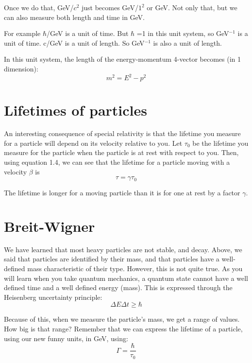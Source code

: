 Once we do that, GeV/$c^2$ just becomes GeV/$1^2$ or GeV. Not only that, but we can also measure both length and time in GeV.

\noindent For example  $\hbar$/GeV is a unit of time.  But $\hbar$ =1 in this unit system, so GeV$^{-1}$ is a unit of time.  c/GeV is a unit of length.  So GeV$^{-1}$ is also a unit of length.


In this unit system, the length of the energy-momentum 4-vector becomes (in 1 dimension):
\begin{equation}
	  m^2 = E^2 - p^2
\end{equation}  	 


\section{Lifetimes of particles}

An interesting consequence of special relativity is that the lifetime you measure for a particle will depend on its velocity relative to you.  Let $\tau _0$  be the lifetime you measure for the particle when the particle is at rest with respect to you.  Then, using equation 1.4, we can see that the lifetime for a particle moving with a velocity $\beta$  is
\begin{equation}
	 \tau  = \gamma \tau _0
\end{equation}  	 

\noindent The lifetime is longer for a moving particle than it is for one at rest by a factor $\gamma$.

\section{Breit-Wigner}

We have learned that most heavy particles are not stable, and decay.  Above, we said that particles are identified by their mass, and that particles have a well-defined mass characteristic of their type.  However, this is not quite true.  As you will learn when you take quantum mechanics, a quantum state cannot have a well defined time and a well defined energy (mass).  This is expressed through the Heisenberg uncertainty principle:
\begin{equation}
	 \Delta E \Delta t   \ge \hbar
\end{equation} 

\noindent Because of this, when we measure the particle's mass, we get a range of values.  How big is that range?  Remember that we can express the lifetime of a particle, using our new funny units, in GeV, using:
 \begin{equation}
	 \Gamma =   \frac{\hbar}{\tau _0}
\end{equation} 
	  

